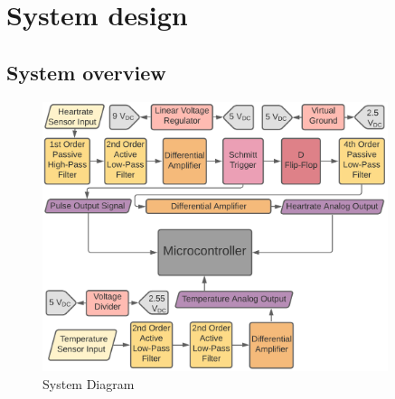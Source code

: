 
\chapter{System design}
\section{System overview} \label{sec:system}

\begin{figure}[h]
    \centering
    \vspace{-0.7cm}
    \includegraphics[width = 0.9\textwidth]{Figures/overview}
    \caption{System Diagram}
    \label{fig:overview}
\end{figure}

